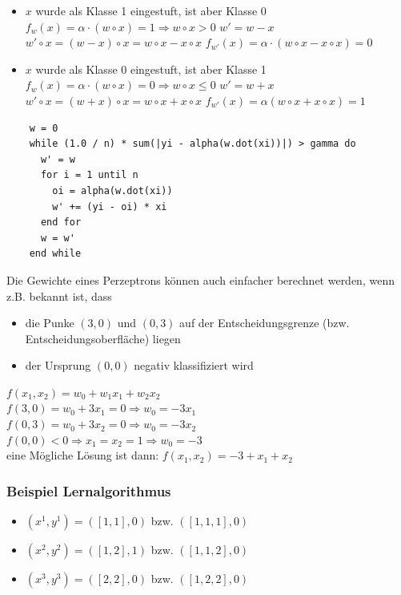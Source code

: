 \documentclass{report}
\begin{document}
  \vspace*{-1.25em}	
  \begin{itemize}	
    \item $x$ wurde als Klasse 1 eingestuft, ist aber Klasse 0	
    \subitem $f_w(x) = \alpha \cdot (w\circ x) = 1 \Rightarrow w\circ x > 0$	
    \subitem $w' = w - x$	
    \subitem $w'\circ x = (w - x)\circ x = w\circ x - x \circ x$	
    \subitem $f_{w'}(x) = \alpha \cdot (w\circ x - x \circ x) = 0$	
    \item $x$ wurde als Klasse 0 eingestuft, ist aber Klasse 1	
    \subitem $f_w(x) = \alpha \cdot (w\circ x) = 0 \Rightarrow w\circ x \leq 0$	
    \subitem $w' = w + x$	
    \subitem $w'\circ x = (w + x)\circ x = w\circ x + x\circ x$	
    \subitem $f_{w'}(x) = \alpha(w\circ x + x\circ x) = 1$	
  \end{itemize}	
  
  
  \begin{lstlisting}	
    w = 0	
    while (1.0 / n) * sum(|yi - alpha(w.dot(xi))|) > gamma do	
      w' = w	
      for i = 1 until n	
        oi = alpha(w.dot(xi))	
        w' += (yi - oi) * xi	
      end for	
      w = w'	
    end while	
  \end{lstlisting}	
  
  Die Gewichte eines Perzeptrons können auch einfacher berechnet werden, wenn z.B. bekannt ist, dass\\	
  \vspace*{-1.25em}	
  \begin{itemize}	
    \item die Punke $(3, 0)$ und $(0, 3)$ auf der Entscheidungsgrenze (bzw. Entscheidungsoberfläche) liegen	
    \item der Ursprung $(0, 0)$ negativ klassifiziert wird	
  \end{itemize}	
  
  $f(x_1, x_2) = w_0 + w_1x_1 + w_2x_2$\\	
  $f(3, 0) = w_0 + 3x_1 = 0 \Rightarrow w_0 = -3x_1$\\	
  $f(0, 3) = w_0 + 3x_2 = 0 \Rightarrow w_0 = -3x_2$\\	
  $f(0, 0) < 0 \Rightarrow x_1 = x_2 = 1 \Rightarrow w_0 = -3$\\	
  eine Mögliche Lösung ist dann: $f(x_1, x_2) = -3 + x_1 + x_2$	
  
  \subsubsection{Beispiel Lernalgorithmus}	
  \begin{itemize}	
    \item $(x^1, y^1) = ([1, 1], 0)$ bzw. $([1, 1, 1], 0)$	
    \item $(x^2, y^2) = ([1, 2], 1)$ bzw. $([1, 1, 2], 0)$	
    \item $(x^3, y^3) = ([2, 2], 0)$ bzw. $([1, 2, 2], 0)$	
  \end{itemize}	
  
\end{document}

